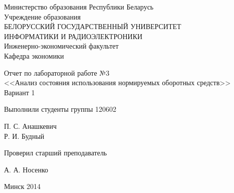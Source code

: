 \thispagestyle{empty}
\setlength{\parindent}{0ex} %

\begin{center}
  Министерство образования Республики Беларусь \\
  \smallskip
  Учреждение образования \\
  БЕЛОРУССКИЙ ГОСУДАРСТВЕННЫЙ УНИВЕРСИТЕТ \\
  ИНФОРМАТИКИ И РАДИОЭЛЕКТРОНИКИ \\
  \smallskip
  Инженерно-экономический факультет \\
  \smallskip
  Кафедра экономики
\end{center}

\vspace{40mm}

\begin{center}
  Отчет по лабораторной работе №3 \\
  <<Анализ состояния использования нормируемых оборотных средств>> \\
  Вариант 1
\end{center}

\vspace{60mm}

\begin{minipage}{.55\linewidth}

  Выполнили студенты группы 120602
  \bigskip

\end{minipage}
\hfill
\begin{minipage}{.4\linewidth}
  \begin{flushright}

    П. С. Анашкевич \\
    Р. И. Будный

  \end{flushright}
\end{minipage}

\vspace{10mm}

\begin{minipage}{.55\linewidth}

  Проверил старший преподаватель

\end{minipage}
\hfill
\begin{minipage}{.4\linewidth}
  \begin{flushright}

    А. А. Носенко

  \end{flushright}
\end{minipage}

\vspace{30mm}
\begin{center}

  Минск 2014

\end{center}

\setlength{\parindent}{5ex} %
